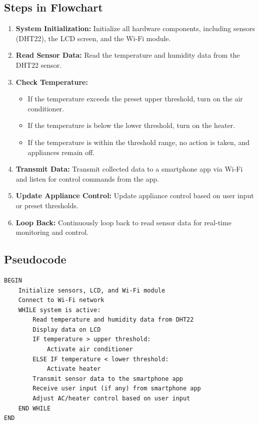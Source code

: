 \documentclass[a4paper,12pt]{article}
\begin{document}
\subsection*{Steps in Flowchart}
\begin{enumerate}
    \item \textbf{System Initialization:} Initialize all hardware components, including sensors (DHT22), the LCD screen, and the Wi-Fi module.
    \item \textbf{Read Sensor Data:} Read the temperature and humidity data from the DHT22 sensor.
    \item \textbf{Check Temperature:}
    \begin{itemize}
        \item If the temperature exceeds the preset upper threshold, turn on the air conditioner.
        \item If the temperature is below the lower threshold, turn on the heater.
        \item If the temperature is within the threshold range, no action is taken, and appliances remain off.
    \end{itemize}
    \item \textbf{Transmit Data:} Transmit collected data to a smartphone app via Wi-Fi and listen for control commands from the app.
    \item \textbf{Update Appliance Control:} Update appliance control based on user input or preset thresholds.
    \item \textbf{Loop Back:} Continuously loop back to read sensor data for real-time monitoring and control.
\end{enumerate}

\subsection*{Pseudocode}
\begin{verbatim}
BEGIN
    Initialize sensors, LCD, and Wi-Fi module
    Connect to Wi-Fi network
    WHILE system is active:
        Read temperature and humidity data from DHT22
        Display data on LCD
        IF temperature > upper threshold:
            Activate air conditioner
        ELSE IF temperature < lower threshold:
            Activate heater
        Transmit sensor data to the smartphone app
        Receive user input (if any) from smartphone app
        Adjust AC/heater control based on user input
    END WHILE
END
\end{verbatim}
\end{document}

